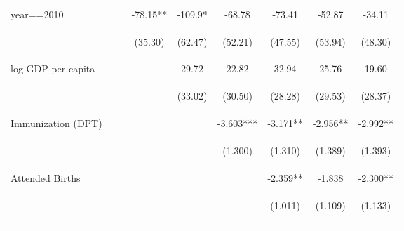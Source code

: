 \begin{landscape}
\begin{subtables}
\begin{table}[htpb!]
\begin{center}
\begin{tabular}{lcccccccc}
year==2010&&&-78.15**&-109.9*&-68.78&-73.41&-52.87&-34.11\\
&&&\begin{footnotesize}(35.30)\end{footnotesize}&\begin{footnotesize}(62.47)\end{footnotesize}&\begin{footnotesize}(52.21)\end{footnotesize}&\begin{footnotesize}(47.55)\end{footnotesize}&\begin{footnotesize}(53.94)\end{footnotesize}&\begin{footnotesize}(48.30)\end{footnotesize}\\
log GDP per capita&&&&29.72&22.82&32.94&25.76&19.60\\
&&&&\begin{footnotesize}(33.02)\end{footnotesize}&\begin{footnotesize}(30.50)\end{footnotesize}&\begin{footnotesize}(28.28)\end{footnotesize}&\begin{footnotesize}(29.53)\end{footnotesize}&\begin{footnotesize}(28.37)\end{footnotesize}\\
Immunization (DPT) &&&&&-3.603***&-3.171**&-2.956**&-2.992**\\
&&&&&\begin{footnotesize}(1.300)\end{footnotesize}&\begin{footnotesize}(1.310)\end{footnotesize}&\begin{footnotesize}(1.389)\end{footnotesize}&\begin{footnotesize}(1.393)\end{footnotesize}\\
Attended Births&&&&&&-2.359**&-1.838&-2.300**\\
&&&&&&\begin{footnotesize}(1.011)\end{footnotesize}&\begin{footnotesize}(1.109)\end{footnotesize}&\begin{footnotesize}(1.133)\end{footnotesize}\\

\end{tabular}
\end{center}
\end{table}
\end{subtables}
\end{landscape}
